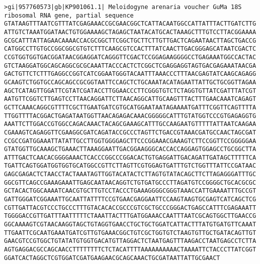 \documentclass[11pt]{article}
\begin{document}
\begin{Verbatim}[commandchars=\\\{\}]
>gi|957760573|gb|KP901061.1| Meloidogyne arenaria voucher GuMa 18S ribosomal RNA gene, partial sequence
GTATAAGTTTAATCGTTTATCGAGAAACCGCGAACGGCTCATTACAATGGCCATTATTTACTTGATCTTG
ATTGTCTAAATGGATAACTGTGGAAAAGCTAGAGCTAATACATGCACTAAAGCTTTGTCCTTACGGAAAA
GCGCATTTATTAGAACAAAACCACGCGGCTTCGGCTGCTTCTTGTTGACTCAGAATAACTTAGCTGACCG
CATGGCCTTGTGCCGGCGGCGTGTCTTTCAAGCGTCCACTTTATCAACTTGACGGGAGCATAATCGACTC
CCGTGGTGGTGACGGATAACGGAGGATCAGGGTTCGACTCCGGAGAAGGGGCCTGAGAAATGGCCACTAC
GTCTAAGGATGGCAGCAGGCGCGCAAATTACCCACTCTCGGCTCGAGGAGGTAGTGACGAGAAATAACGA
GACTGTTCTCTTTGAGGCCGGTCATCGGAATGGGTACAATTTAAACCCTTTAACGAGTATCAAGCAGAGG
GCAAGTCTGGTGCCAGCAGCCGCGGTAATTCCAGCTCTGCAAATACATAGAATTATTGCTGCGGTTAGAA
AGCTCATAGTTGGATTCGTATCGATACCTTGGAACCCTTCGGGTGTCTCTAGGTGTTATCGATTTATCGT
AATGTTCGGTCTTGAGTCCTTAACAGGATTCTTAACAGGCATTGCAAGTTTACTTTGAACAAATCAGAGT
GCTTCAAACAGGCGTTTTCGCTTGAATGATCGTGCATGGAATAATAGAAAATGATTTCGGTTCAGTTTTA
TTGGTTTTACGGACTGAGATAATGGTTAACAGAGACAAACGGGGGCATTTGTATGGTCCCGTGAGAGGTG
AAATTCTTGGACCGTGGCCAGACAAACTACAGCGAAAGCATTTGCCAAGAATGTTTTTATTAATCAAGAA
CGAAAGTCAGAGGTTCGAAGGCGATCAGATACCGCCCTAGTTCTGACCGTAAACGATGCCAACTAGCGAT
CCGCCGATGGAAATTATATTGCCTTGGTGGGGAGCTTCCCGGAAACGAAAGTCTTCCGGTTCCGGGGGAA
GTATGGTTGCAAAGCTGAAACTTAAAGGAATTGACGGAAGGGCACCACCAGGAGTGGAGCCTGCGGCTTA
ATTTGACTCAACACGGGGAAACTCACCCGGCCCGGACACTGTGAGGATTGACAGATTGATAGCTTTTTCA
TGATTCAGTGGATGGTGGTGCATGGCCGTTCTTAGTTCGTGGAGTGATTTGTCTGGTTTATTCCGATAAC
GAGCGAGACTCTAACCTACTAAATAGTTGGTACATACTCTTAGTGTATACAGCTTCTTAGAGGGATTTGC
GGCGTTCAGCCGAAAGAAATTGAGCAATAACAGGTCTGTGATGCCCTTAGATGTCCGGGGCTGCACGCGC
GCTACACTGGCAAAATCAACGTGCTTGTCCTACCCTGAAAGGGGCGGGTAAACCATTGAAAATTTGCCGT
GATTGGGATCGGAAATTGCAATTATTTTCCGTGAACGAGGAATTCCAAGTAAGTGCGAGTCATCAGCTCG
CGTTGATTACGTCCCTGCCCTTTGTACACACCGCCCGTCGCTGCCCGGGACTGAGCCATTTCGAGAAATT
TGGGGACCGTTGATTTAATTTTTCTAAATTACTTTGATGGAAACCAATTTAATCGCAGTGGCTTGAACCG
GGCAAAAGTCGTAACAAGGTAGCTGTAGGTGAACCTGCTGCTGGATCATTACTTTATGTGATGTTCAAAT
TTGAATTCGCAATGAAATGATCGTTGTGAAACGGCTGTCGCTGGTGTCTAAGTGTTGCTGATACAGTTGT
GAACGTCCGTGGCTGTATATGTGGTGACATGTTAGGACTCTAATGAGTTTAAGACCTAATGAGCCTCTTA
AGTGAGGACGCCAGCAACCTTTTTTTTCTCTACATTTTAAAAAAAAAACTAAAATTCTACCCTTATCGGT
GGATCACTAGGCTCGTGGATCGATGAAGAACGCAGCAAACTGCGATAATTATTGCGAACT


\end{Verbatim}
\end{document}
